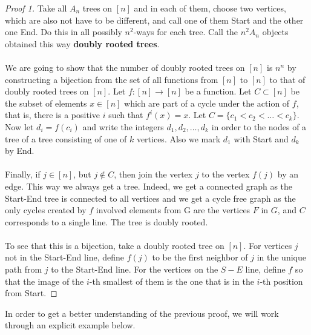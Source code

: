 \documentclass[12pt,a4paper]{article}
\theoremstyle{definition}
\begin{document}
\begin{proof}[Proof 1] Take all $A_n$ trees on $[n]$ and in each of them,  choose two vertices, which are also not have to be different, and call one of them Start and the other one End. Do this in all possibly $n^2$-ways for each tree. Call the $n^2A_n$ objects obtained this way \textbf{doubly rooted trees}.
\\\\
We are going to show that the number of doubly rooted trees on $[n]$ is $n^n$ by constructing a bijection from the set of all functions from $[n]$ to $[n]$ to that of doubly rooted trees on $[n]$. Let $f: [n] \to [n]$ be a function. Let $C \subset [n]$ be the subset of elements $x \in [n]$ which are part of a cycle under the action of $f$, that is,  there is a positive $i$ such that $f^i(x)=x$. Let $C=\{c_1 < c_2< \dots < c_k \}.$ Now let $d_i = f(c_i)$ and write the integers $d_1, d_2, \dots , d_k$ in order to the nodes of a tree of a tree consisting of one of $k$ vertices. Also we mark $d_1$ with Start and $d_k$ by End. 
\\\\
Finally,  if $j \in [n]$, but $j \notin C$, then join the vertex $j$ to the vertex $f(j)$ by an edge. This way we always get a tree. Indeed, we get a connected graph as the Start-End tree is connected to all vertices and we get a cycle free graph as the only cycles created by $f$  involved elements from G are the vertices $F$ in $G$, and $C$ corresponds to a single line. The tree is doubly rooted. \\
\\
To see that this is a bijection,  take a doubly rooted tree on $[n]$. For vertices $j$ not in the Start-End line,  define $f(j)$ to be the first neighbor of $j$ in the unique path from $j$ to the Start-End line. For the vertices on the $S-E$ line,  define $f$ so that the image of the $i$-th smallest of them is the one that is in the $i$-th position from Start. 
\end{proof}
\newpage
In order to get a better understanding of the previous proof, we will work through an explicit example below. 
\end{document}
